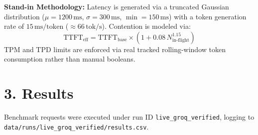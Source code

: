 \documentclass[9pt,twocolumn]{article}
\begin{document}
\textbf{Stand-in Methodology:} Latency is generated via a truncated Gaussian distribution ($\mu = 1200\,\mathrm{ms}$, $\sigma = 300\,\mathrm{ms}$, $\min = 150\,\mathrm{ms}$) with a token generation rate of $15\,\mathrm{ms/token}$ ($\approx 66\,\mathrm{tok/s}$). Contention is modeled via:
$$\mathrm{TTFT}_{\mathrm{eff}} = \mathrm{TTFT}_{\mathrm{base}} \times \left(1 + 0.08\,N_{\mathrm{in\text{-}flight}}^{1.15}\right)$$
TPM and TPD limits are enforced via real tracked rolling-window token consumption rather than manual booleans.

\section{3. Results}
Benchmark requests were executed under run ID \texttt{live\_groq\_verified}, logging to \texttt{data/runs/live\_groq\_verified/results.csv}.
\end{document}
